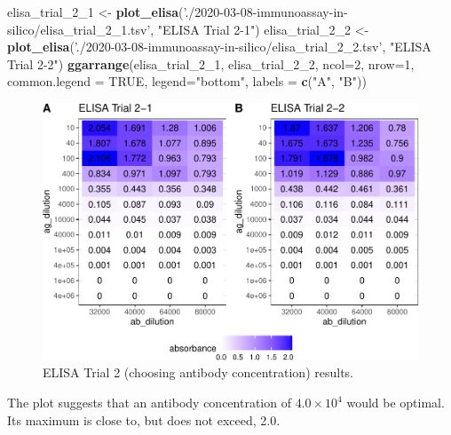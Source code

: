 \documentclass[
]{article}
\newenvironment{Shaded}{\begin{snugshade}}{\end{snugshade}}
\newcommand{\DataTypeTok}[1]{\textcolor[rgb]{0.13,0.29,0.53}{#1}}
\newcommand{\DecValTok}[1]{\textcolor[rgb]{0.00,0.00,0.81}{#1}}
\newcommand{\KeywordTok}[1]{\textcolor[rgb]{0.13,0.29,0.53}{\textbf{#1}}}
\newcommand{\NormalTok}[1]{#1}
\newcommand{\OtherTok}[1]{\textcolor[rgb]{0.56,0.35,0.01}{#1}}
\newcommand{\StringTok}[1]{\textcolor[rgb]{0.31,0.60,0.02}{#1}}
\begin{document}
\begin{Shaded}
\begin{Highlighting}[]
\NormalTok{elisa_trial_}\DecValTok{2}\NormalTok{_}\DecValTok{1}\NormalTok{ <-}\StringTok{ }\KeywordTok{plot_elisa}\NormalTok{(}\StringTok{'./2020-03-08-immunoassay-in-silico/elisa_trial_2_1.tsv'}\NormalTok{, }\StringTok{"ELISA Trial 2-1"}\NormalTok{)}
\NormalTok{elisa_trial_}\DecValTok{2}\NormalTok{_}\DecValTok{2}\NormalTok{ <-}\StringTok{ }\KeywordTok{plot_elisa}\NormalTok{(}\StringTok{'./2020-03-08-immunoassay-in-silico/elisa_trial_2_2.tsv'}\NormalTok{, }\StringTok{"ELISA Trial 2-2"}\NormalTok{)}
\KeywordTok{ggarrange}\NormalTok{(elisa_trial_}\DecValTok{2}\NormalTok{_}\DecValTok{1}\NormalTok{, elisa_trial_}\DecValTok{2}\NormalTok{_}\DecValTok{2}\NormalTok{, }\DataTypeTok{ncol=}\DecValTok{2}\NormalTok{, }\DataTypeTok{nrow=}\DecValTok{1}\NormalTok{, }\DataTypeTok{common.legend =} \OtherTok{TRUE}\NormalTok{, }\DataTypeTok{legend=}\StringTok{"bottom"}\NormalTok{, }\DataTypeTok{labels =} \KeywordTok{c}\NormalTok{(}\StringTok{"A"}\NormalTok{, }\StringTok{"B"}\NormalTok{))}
\end{Highlighting}
\end{Shaded}

\begin{figure}
\includegraphics[width=1\linewidth]{2020-03-08-immunoassay-in-silico_files/figure-latex/elisa-t2-1} \caption{ELISA Trial 2 (choosing antibody concentration) results.}\label{fig:elisa-t2}
\end{figure}

The plot suggests that an antibody concentration of \(4.0\times10^4\) would be optimal. Its maximum is close to, but does not exceed, 2.0.
\end{document}
